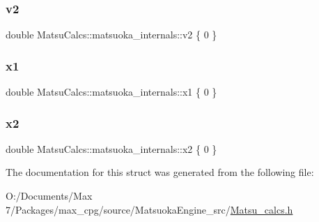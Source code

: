 \subsubsection{\texorpdfstring{v2}{v2}}
{\footnotesize\ttfamily double Matsu\+Calcs\+::matsuoka\+\_\+internals\+::v2 \{ 0 \}}

\mbox{\label{structMatsuCalcs_1_1matsuoka__internals_a94e9d15c2de229653c4bf4542cf7df34}} 
\subsubsection{\texorpdfstring{x1}{x1}}
{\footnotesize\ttfamily double Matsu\+Calcs\+::matsuoka\+\_\+internals\+::x1 \{ 0 \}}

\mbox{\label{structMatsuCalcs_1_1matsuoka__internals_a5e8455597562089dae55b3b6598433ad}} 
\subsubsection{\texorpdfstring{x2}{x2}}
{\footnotesize\ttfamily double Matsu\+Calcs\+::matsuoka\+\_\+internals\+::x2 \{ 0 \}}



The documentation for this struct was generated from the following file\+:\begin{DoxyCompactItemize}
\item 
O\+:/\+Documents/\+Max 7/\+Packages/max\+\_\+cpg/source/\+Matsuoka\+Engine\+\_\+src/\mbox{\hyperlink{Matsu__calcs_8h}{Matsu\+\_\+calcs.\+h}}\end{DoxyCompactItemize}
